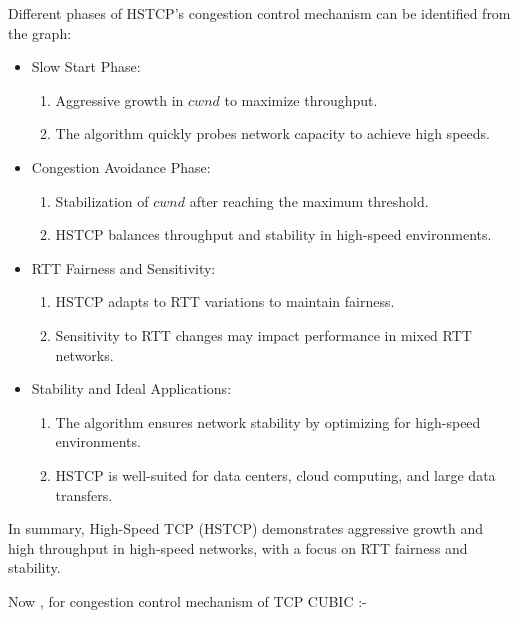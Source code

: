 \documentclass[11pt,a4paper]{article}
\begin{document}
Different phases of HSTCP's congestion control mechanism can be identified from the graph:
\begin{itemize}
    \item Slow Start Phase: {
        \begin{enumerate}
            \item Aggressive growth in $cwnd$ to maximize throughput.
            \item The algorithm quickly probes network capacity to achieve high speeds.
        \end{enumerate}
    }
    \item Congestion Avoidance Phase: {
        \begin{enumerate}
            \item Stabilization of $cwnd$ after reaching the maximum threshold.
            \item HSTCP balances throughput and stability in high-speed environments.
        \end{enumerate}
    }
    \item RTT Fairness and Sensitivity: {
        \begin{enumerate}
            \item HSTCP adapts to RTT variations to maintain fairness.
            \item Sensitivity to RTT changes may impact performance in mixed RTT networks.
        \end{enumerate}
    }
    \item Stability and Ideal Applications: {
        \begin{enumerate}
            \item The algorithm ensures network stability by optimizing for high-speed environments.
            \item HSTCP is well-suited for data centers, cloud computing, and large data transfers.
        \end{enumerate}
    }
\end{itemize}

In summary, High-Speed TCP (HSTCP) demonstrates aggressive growth and high throughput in high-speed networks, with a focus on RTT fairness and stability.

Now , for congestion control mechanism of TCP CUBIC :-
\end{document}
